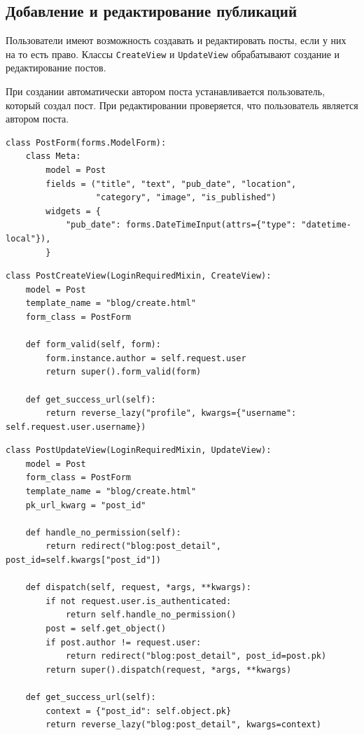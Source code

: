 \documentclass[bachelor, och, pract]{SCWorks}
\begin{document}
\newpage
\subsection{Добавление и редактирование публикаций}

Пользователи имеют возможность создавать и редактировать посты, если у них на то есть право.
Классы \texttt{CreateView} и \texttt{UpdateView} обрабатывают создание и редактирование постов. 

При создании автоматически автором поста устанавливается пользователь, который создал пост. 
При редактировании проверяется, что пользователь является автором поста.

\begin{lstlisting}
class PostForm(forms.ModelForm):
    class Meta:
        model = Post
        fields = ("title", "text", "pub_date", "location",
                  "category", "image", "is_published")
        widgets = {
            "pub_date": forms.DateTimeInput(attrs={"type": "datetime-local"}),
        }
\end{lstlisting}

\begin{lstlisting}
class PostCreateView(LoginRequiredMixin, CreateView):
    model = Post
    template_name = "blog/create.html"
    form_class = PostForm

    def form_valid(self, form):
        form.instance.author = self.request.user
        return super().form_valid(form)

    def get_success_url(self):
        return reverse_lazy("profile", kwargs={"username": self.request.user.username})
\end{lstlisting}

\begin{lstlisting}
class PostUpdateView(LoginRequiredMixin, UpdateView):
    model = Post
    form_class = PostForm
    template_name = "blog/create.html"
    pk_url_kwarg = "post_id"

    def handle_no_permission(self):
        return redirect("blog:post_detail", post_id=self.kwargs["post_id"])

    def dispatch(self, request, *args, **kwargs):
        if not request.user.is_authenticated:
            return self.handle_no_permission()
        post = self.get_object()
        if post.author != request.user:
            return redirect("blog:post_detail", post_id=post.pk)
        return super().dispatch(request, *args, **kwargs)

    def get_success_url(self):
        context = {"post_id": self.object.pk}
        return reverse_lazy("blog:post_detail", kwargs=context)
\end{lstlisting}
\end{document}
